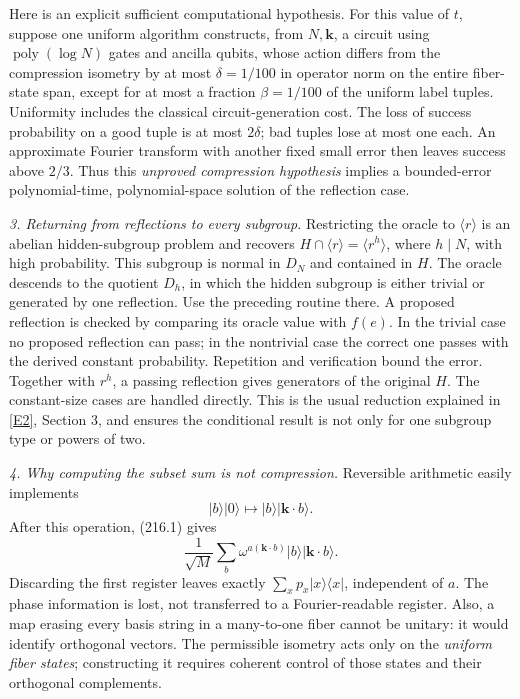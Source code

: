 \documentclass[11pt,a4paper]{article}
\newcommand{\eref}[2]{\hyperlink{extra:#1:#2}{[E#2]}}
\begin{document}
Here is an explicit sufficient computational hypothesis. For this value
of $t$, suppose one uniform algorithm constructs, from $N,\mathbf k$,
a circuit using $\operatorname{poly}(\log N)$ gates and ancilla qubits,
whose action differs from the compression isometry by at most
$\delta=1/100$ in operator norm on the entire fiber-state span, except
for at most a fraction $\beta=1/100$ of the uniform label tuples.
Uniformity includes the classical circuit-generation cost. The loss of
success probability on a good tuple is at most $2\delta$; bad tuples lose
at most one each. An approximate Fourier transform with another fixed
small error then leaves success above $2/3$. Thus this \emph{unproved
compression hypothesis} implies a bounded-error polynomial-time,
polynomial-space solution of the reflection case.

\textit{3. Returning from reflections to every subgroup.}
Restricting the oracle to $\langle r\rangle$ is an abelian hidden-subgroup
problem and recovers $H\cap\langle r\rangle=\langle r^h\rangle$, where
$h\mid N$, with high probability. This subgroup is normal in $D_N$ and
contained in $H$. The oracle descends to the quotient $D_h$, in which
the hidden subgroup is either trivial or generated by one reflection.
Use the preceding routine there. A proposed reflection is checked by
comparing its oracle value with $f(e)$. In the trivial case no proposed
reflection can pass; in the nontrivial case the correct one passes with
the derived constant probability. Repetition and verification bound the
error. Together with $r^h$, a passing reflection gives generators of the
original $H$. The constant-size cases are handled directly. This is the
usual reduction explained in \eref{216}{2}, Section 3, and ensures the
conditional result is not only for one subgroup type or powers of two.

\textit{4. Why computing the subset sum is not compression.}
Reversible arithmetic easily implements
\[
 |b\rangle|0\rangle\longmapsto|b\rangle|\mathbf k\cdot b\rangle.
\]
After this operation, (216.1) gives
\[
 \frac1{\sqrt M}\sum_b\omega^{a(\mathbf k\cdot b)}
              |b\rangle|\mathbf k\cdot b\rangle.             \tag{216.5}
\]
Discarding the first register leaves exactly
$\sum_xp_x|x\rangle\langle x|$, independent of $a$.
The phase information is lost, not transferred to a Fourier-readable
register. Also, a map erasing every basis string in a many-to-one fiber
cannot be unitary: it would identify orthogonal vectors. The permissible
isometry acts only on the \emph{uniform fiber states}; constructing it
requires coherent control of those states and their orthogonal complements.
\end{document}
